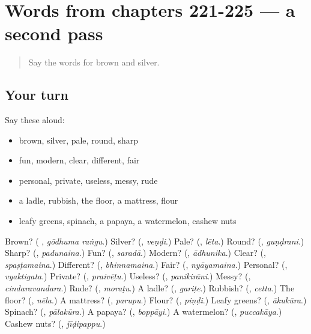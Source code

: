 \section[(dialogue)]{Words from chapters 221-225 — a second pass}

\label{lesson:TE-R225-second-pass-words-from-chapters-221-225}



\begin{quote}
Say the words for brown and silver.
\end{quote}

\subsection*{Your turn}
Say these aloud:

\begin{itemize}
\raggedright
  \item brown, silver, pale, round, sharp
  \item fun, modern, clear, different, fair
  \item personal, private, useless, messy, rude
  \item a ladle, rubbish, the floor, a mattress, flour
  \item leafy greens, spinach, a papaya, a watermelon, cashew nuts
\end{itemize}

\begin{tcolorbox}[breakable,colback=teal!4,colframe=teal!35!black,title={Before you move on}]
Brown? (\textbf{ }, \emph{gōdhuma raṅgu}.) Silver? (\textbf{}, \emph{veṇḍi}.) Pale? (\textbf{}, \emph{lēta}.) Round? (\textbf{}, \emph{guṇḍrani}.) Sharp? (\textbf{}, \emph{padunaina}.) Fun? (\textbf{}, \emph{saradā}.) Modern? (\textbf{}, \emph{ādhunika}.) Clear? (\textbf{}, \emph{spaṣṭamaina}.) Different? (\textbf{}, \emph{bhinnamaina}.) Fair? (\textbf{}, \emph{nyāyamaina}.) Personal? (\textbf{}, \emph{vyaktigata}.) Private? (\textbf{}, \emph{praivēṭu}.) Useless? (\textbf{}, \emph{panikirāni}.) Messy? (\textbf{}, \emph{cindaravandara}.) Rude? (\textbf{}, \emph{moraṭu}.) A ladle? (\textbf{}, \emph{gariṭe}.) Rubbish? (\textbf{}, \emph{cetta}.) The floor? (\textbf{}, \emph{nēla}.) A mattress? (\textbf{}, \emph{parupu}.) Flour? (\textbf{}, \emph{piṇḍi}.) Leafy greens? (\textbf{}, \emph{ākukūra}.) Spinach? (\textbf{}, \emph{pālakūra}.) A papaya? (\textbf{}, \emph{boppāyi}.) A watermelon? (\textbf{}, \emph{puccakāya}.) Cashew nuts? (\textbf{}, \emph{jīḍipappu}.)
\end{tcolorbox}

